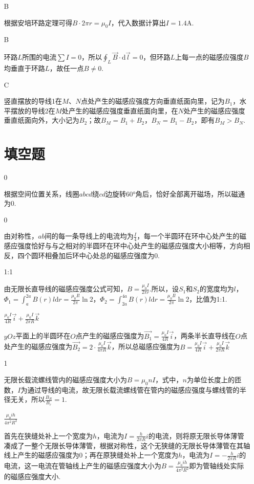 \documentclass[b5paper,opensource,sourcefont,parskip]{qyxf-book}
\newcommand{\di}[1]{\mathrm{d}#1}
\begin{document}
B

\solve
根据安培环路定理可得$B\cdot 2\pi r=\mu_0I$，代入数据计算出$I=1.4$A.

B

\solve
环路$L$所围的电流$\sum I=0$，所以$\oint_L\vec{B}\cdot\di\vec{l}=0$，但环路$L$上每一点的磁感应强度$B$均垂直于环路$L$，故任一点$B\ne0$.

C

\solve
竖直摆放的导线1在$M$、$N$点处产生的磁感应强度方向垂直纸面向里，记为$B_1$，水平摆放的导线2在$M$处产生的磁感应强度垂直纸面向里，在$N$处产生的磁感应强度垂直纸面向外，大小记为$B_2$；故$B_M=B_1+B_2$，$B_N=B_1-B_2$，即有$B_M>B_N$.

\section{填空题}
 0

\analysis
根据空间位置关系，线圈$abcd$绕$cd$边旋转60°角后，恰好全部离开磁场，所以磁通为0.

 0

\analysis
由对称性，$ab$间的每一条导线上的电流均为$\frac{I}{4}$，每一个半圆环在环中心处产生的磁感应强度恰好与与之相对的半圆环在环中心处产生的磁感应强度大小相等，方向相反，四个圆环相叠加后环中心处总的磁感应强度为0.

 1:1

\solve
由无限长直导线的磁感应强度公式可知，$B=\frac{\mu_0I}{2\pi r}$.所以，设$S_1$和$S_2$的宽度均为$l$，$\Phi_1=\int_a^{2a}B(r)l\di r=\frac{\mu_0Il}{2\pi}\ln2$，$\Phi_2=\int_{2a}^{4a}B(r)l\di r=\frac{\mu_0Il}{2\pi}\ln2$，比值为1:1.

 $\frac{\mu_0I}{4R}\vec{i}+\frac{\mu_0I}{2\pi R}\vec{k}$

\solve
$yOz$平面上的半圆环在$O$点产生的磁感应强度为$\vec{B_1}=\frac{\mu_0I}{4R}\vec{i}$，两条半长直导线在$O$点处产生的磁感应强度为$\vec{B_2}=2\cdot\frac{\mu_0I}{4\pi R}\vec{k}$，所以总磁感应强度为$B=\frac{\mu_0I}{4R}\vec{i}+\frac{\mu_0I}{2\pi R}\vec{k}$


 1

\analysis
无限长载流螺线管内的磁感应强度大小为$B=\mu_0nI$，式中，$n$为单位长度上的匝数，$I$为通过导线的电流，故无限长载流螺线管在管内的磁感应强度与螺线管的半径无关，所以$\frac{B_R}{B_r}=1$.

 $\frac{\mu_0ih}{4\pi^2R^2}$

\solve
首先在狭缝处补上一个宽度为$h$，电流为$I=\frac{h}{2\pi R}i$的电流，则将原无限长导体薄管凑成了一整个无限长导体薄管，根据对称性，这个无狭缝的无限长导体薄管在其轴线上产生的磁感应强度为0；再在原狭缝处补上一个宽度为$h$，电流为$I=-\frac{h}{2\pi R}i$的电流，这一电流在管轴线上产生的磁感应强度大小为$B=\frac{\mu_0ih}{4\pi^2R^2}$即为管轴线处实际的磁感应强度大小.
\end{document}
